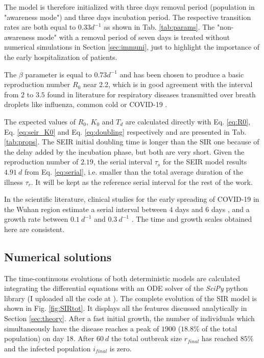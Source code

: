 \documentclass[DIV=12, BCOR=0pt]{scrartcl}  %
\begin{document}
  The model is therefore initialized with three days removal period (population in "awareness mode") and three days incubation period. 
  The respective transition rates are both equal to $0.33 d^{-1}$ as shown in Tab. \ref{tab:params}. 
  The "non-awareness mode" with a removal period of seven days is treated without numerical simulations in Section \ref{sec:immuni}, just to highlight the importance of the early hospitalization of patients. 
  
 
  
  The $\beta$ parameter is equal to $0.73 d^{-1}$ and has been chosen to produce a basic reproduction number $R_0$ near 2.2, which is in good agreement with the interval from $2$ to $3.5$ found in literature for respiratory diseases transmitted over breath droplets like influenza, common cold or COVID-19 \citep{Hilton2020, Sanche2020, Firth2020}. %
  
  The expected values of $R_0$, $K_0$ and $T_d$ are calculated directly with Eq. \ref{eq:R0}, Eq. \ref{eq:seir_K0} and Eq. \ref{eq:doubling} respectively and are presented in Tab. \ref{tab:props}. The SEIR initial doubling time is longer than the SIR one because of the delay added by the incubation phase, but both are very short. Given the reproduction number of $2.19$, the serial interval $\tau_s$ for the SEIR model results $4.91 \ d$ from Eq. \ref{eq:serial}, i.e. smaller than the total average duration of the illness $\tau_{r}$. It will be kept as the reference serial interval for the rest of the work.
  
  In the scientific literature, clinical studies for the early spreading of COVID-19 in the Wuhan region estimate a serial interval between $4$ days \citep{Du2020} and $6$ days \citep{Firth2020}, and a growth rate between $0.1 \ d^{-1}$ \citep{Du2020} and $0.3 \ d^{-1}$ \citep{Sanche2020}. The time and growth scales obtained here are consistent.
    
  
  \subsection{Numerical solutions}
	The time-continuous evolutions of both deterministic models are calculated integrating the differential equations with an ODE solver of the \textit{SciPy} python library (I uploaded all the code at \citet{pyndemic}). 	%
	The complete evolution of the SIR model is shown in Fig. \ref{fig:SIRtot}. It displays all the features discussed analytically in Section \ref{sec:theory}. After a fast initial growth, the number of individuals which simultaneously have the disease reaches a peak of $1900$ ($18.8 \%$ of the total population) on day 18. After $60 \ d$ the total outbreak size $r_{final}$ has reached $85 \%$ and the infected population $i_{final}$ is zero.
	
\end{document}
